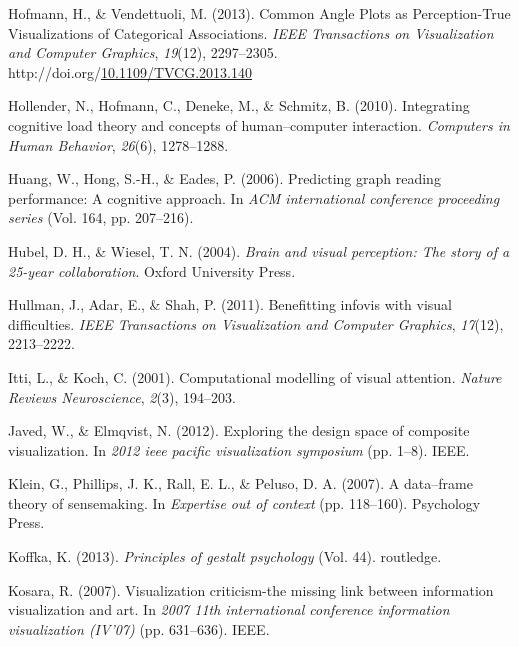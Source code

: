 \documentclass[print]{nuthesis}
\newlength{\cslhangindent}
\newenvironment{CSLReferences}[2]%
{\setlength{\parindent}{0pt}%
\everypar{\setlength{\hangindent}{\cslhangindent}}\ignorespaces}%
{\par}
\begin{document}
\begin{CSLReferences}{1}{0}
\leavevmode{}%
Hofmann, H., \& Vendettuoli, M. (2013). {Common Angle Plots as Perception-True Visualizations of Categorical Associations}. \emph{IEEE Transactions on Visualization and Computer Graphics}, \emph{19}(12), 2297--2305. http://doi.org/\href{https://doi.org/10.1109/TVCG.2013.140}{10.1109/TVCG.2013.140}

\leavevmode{}%
Hollender, N., Hofmann, C., Deneke, M., \& Schmitz, B. (2010). Integrating cognitive load theory and concepts of human--computer interaction. \emph{Computers in Human Behavior}, \emph{26}(6), 1278--1288.

\leavevmode{}%
Huang, W., Hong, S.-H., \& Eades, P. (2006). Predicting graph reading performance: A cognitive approach. In \emph{ACM international conference proceeding series} (Vol. 164, pp. 207--216).

\leavevmode{}%
Hubel, D. H., \& Wiesel, T. N. (2004). \emph{Brain and visual perception: The story of a 25-year collaboration}. Oxford University Press.

\leavevmode{}%
Hullman, J., Adar, E., \& Shah, P. (2011). Benefitting infovis with visual difficulties. \emph{IEEE Transactions on Visualization and Computer Graphics}, \emph{17}(12), 2213--2222.

\leavevmode{}%
Itti, L., \& Koch, C. (2001). Computational modelling of visual attention. \emph{Nature Reviews Neuroscience}, \emph{2}(3), 194--203.

\leavevmode{}%
Javed, W., \& Elmqvist, N. (2012). Exploring the design space of composite visualization. In \emph{2012 ieee pacific visualization symposium} (pp. 1--8). IEEE.

\leavevmode{}%
Klein, G., Phillips, J. K., Rall, E. L., \& Peluso, D. A. (2007). A data--frame theory of sensemaking. In \emph{Expertise out of context} (pp. 118--160). Psychology Press.

\leavevmode{}%
Koffka, K. (2013). \emph{Principles of gestalt psychology} (Vol. 44). routledge.

\leavevmode{}%
Kosara, R. (2007). Visualization criticism-the missing link between information visualization and art. In \emph{2007 11th international conference information visualization (IV'07)} (pp. 631--636). IEEE.


\end{CSLReferences}
\end{document}
